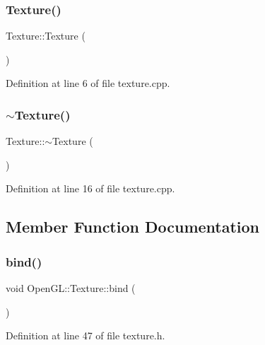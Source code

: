 \subsubsection{\texorpdfstring{Texture()}{Texture()}}
{\footnotesize\ttfamily Texture\+::\+Texture (\begin{DoxyParamCaption}{ }\end{DoxyParamCaption})}



Definition at line 6 of file texture.\+cpp.

\mbox{\label{class_open_g_l_1_1_texture_a09c4bcb7462f64c1d20fa69dba3cee8a}} 
\subsubsection{\texorpdfstring{$\sim$Texture()}{~Texture()}}
{\footnotesize\ttfamily Texture\+::$\sim$\+Texture (\begin{DoxyParamCaption}{ }\end{DoxyParamCaption})}



Definition at line 16 of file texture.\+cpp.



\subsection{Member Function Documentation}
\mbox{\label{class_open_g_l_1_1_texture_a5ea786e618849c76825597fe53af8990}} 
\subsubsection{\texorpdfstring{bind()}{bind()}}
{\footnotesize\ttfamily void Open\+G\+L\+::\+Texture\+::bind (\begin{DoxyParamCaption}{ }\end{DoxyParamCaption})\hspace{0.3cm}{\ttfamily [inline]}}



Definition at line 47 of file texture.\+h.

\mbox{\label{class_open_g_l_1_1_texture_a1d8a63d9862d8149836737b19a2b4c7d}} 
